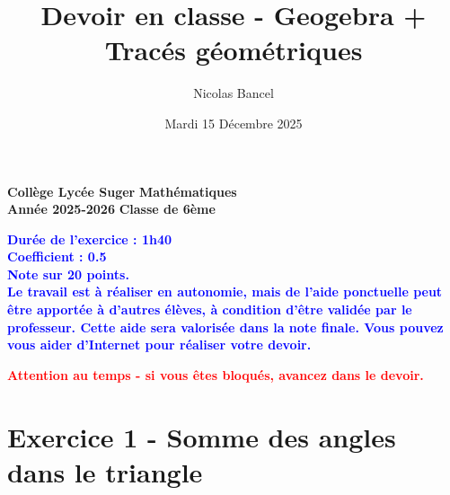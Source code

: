 \documentclass[answers]{exam}
\title{Devoir en classe - Geogebra + Tracés géométriques}
\author{Nicolas Bancel}
\date{Mardi 15 Décembre 2025}
\begin{document}
\textbf{Collège Lycée Suger}
\hfill
\textbf{Mathématiques} \\

\textbf{Année 2025-2026}
\hfill
\textbf{Classe de 6ème} \par

{\let\newpage\relax\maketitle}

\begin{tcolorbox}[
  colframe=blue!90!black,
  fonttitle=\bfseries,
  boxsep=4pt,
  sharp corners,
]
\begin{center}
\textbf{\textcolor{blue}{Durée de l'exercice : 1h40 \\
Coefficient : 0.5 \\
Note sur 20 points. \\
Le travail est à réaliser en autonomie, mais de l'aide ponctuelle peut être apportée à d'autres élèves, à condition d'être validée par le professeur. Cette aide sera valorisée dans la note finale. Vous pouvez vous aider d'Internet pour réaliser votre devoir.
}}
\end{center}
\end{tcolorbox}

\vspace{0.3em}

\begin{center}
  \textbf{\textcolor{red}{Attention au temps - si vous êtes bloqués, avancez dans le devoir.}}
\end{center}


\section*{Exercice 1 - Somme des angles dans le triangle}
\end{document}
